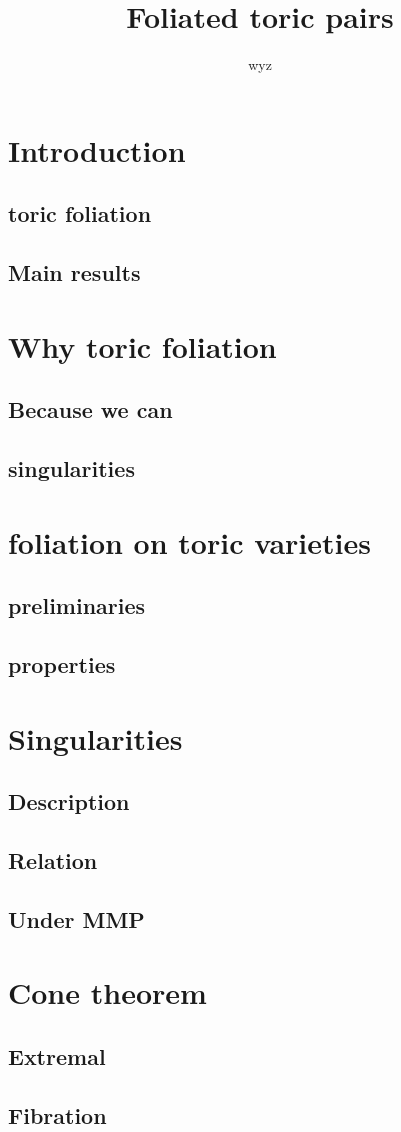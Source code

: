 \documentclass{article}
\title{Foliated toric pairs}
\author{wyz}
\begin{document}
\maketitle
\section{Introduction}
\subsection{toric foliation}
\subsection{Main results}
\section{Why toric foliation}
\subsection{Because we can}
\subsection{singularities}
\section{foliation on toric varieties}
\subsection{preliminaries}
\subsection{properties}
\section{Singularities}
\subsection{Description}
\subsection{Relation}
\subsection{Under MMP}
\section{Cone theorem}
\subsection{Extremal}
\subsection{Fibration}
\end{document}
